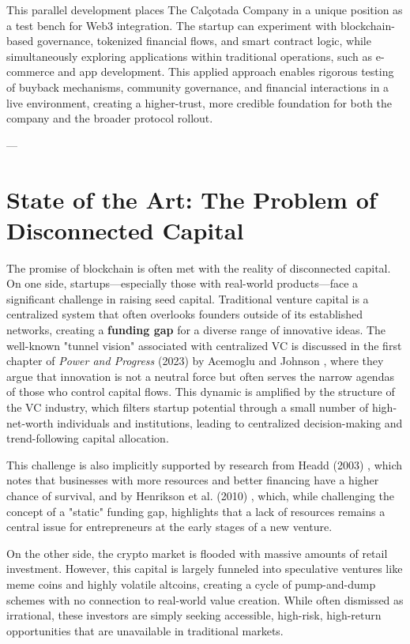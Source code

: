 \documentclass[conference]{IEEEtran}
\begin{document}
This parallel development places The Calçotada Company in a unique position as a test bench for Web3 integration. The startup can experiment with blockchain-based governance, tokenized financial flows, and smart contract logic, while simultaneously exploring applications within traditional operations, such as e-commerce and app development. This applied approach enables rigorous testing of buyback mechanisms, community governance, and financial interactions in a live environment, creating a higher-trust, more credible foundation for both the company and the broader protocol rollout.

---

\section{State of the Art: The Problem of Disconnected Capital}

The promise of blockchain is often met with the reality of disconnected capital. On one side, startups—especially those with real-world products—face a significant challenge in raising seed capital. Traditional venture capital is a centralized system that often overlooks founders outside of its established networks, creating a \textbf{funding gap} for a diverse range of innovative ideas. The well-known "tunnel vision" associated with centralized VC is discussed in the first chapter of \textit{Power and Progress} (2023) by Acemoglu and Johnson \cite{acemoglu2023power}, where they argue that innovation is not a neutral force but often serves the narrow agendas of those who control capital flows. This dynamic is amplified by the structure of the VC industry, which filters startup potential through a small number of high-net-worth individuals and institutions, leading to centralized decision-making and trend-following capital allocation.

This challenge is also implicitly supported by research from Headd (2003) \cite{headd2003redefining}, which notes that businesses with more resources and better financing have a higher chance of survival, and by Henrikson et al. (2010) \cite{henrikson2010funding}, which, while challenging the concept of a "static" funding gap, highlights that a lack of resources remains a central issue for entrepreneurs at the early stages of a new venture.

On the other side, the crypto market is flooded with massive amounts of retail investment. However, this capital is largely funneled into speculative ventures like meme coins and highly volatile altcoins, creating a cycle of pump-and-dump schemes with no connection to real-world value creation. While often dismissed as irrational, these investors are simply seeking accessible, high-risk, high-return opportunities that are unavailable in traditional markets.
\end{document}
